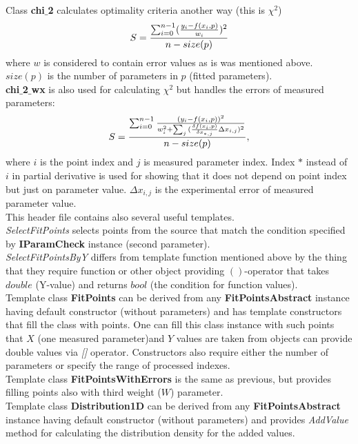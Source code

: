 \documentclass[a4paper]{article}
\begin{document}
\\
Class \textbf{chi$\_$2} calculates optimality criteria another way (this is $\chi^2$)
\begin{equation}\Large
S = \frac{\sum_{i=0}^{n-1}(\frac{y_i-f(x_i,p)}{w_i})^2}{n - size(p)}
\label{chi_2}
\end{equation}
where $w$ is considered to contain error values as is was mentioned above. $size(p)$ is the number of parameters in $p$ (fitted parameters).
\\
\textbf{chi$\_$2$\_$wx} is also used for calculating $\chi^2$ but handles the errors of measured parameters:
\begin{equation}\Large
S = \frac{\sum_{i=0}^{n-1}\frac{(y_i-f(x_i,p))^2}{w_i^2+\sum_j{(\frac{\delta f(x_i,p)}{\delta x_{*,j}}\Delta x_{i,j})^2}}}{n - size(p)},
\label{chi_2_ex}
\end{equation}
where $i$ is the point index and $j$ is measured parameter index.
Index $*$ instead of $i$ in partial derivative is used for showing that it does not depend on point index but just on parameter value.
$\Delta x_{i,j}$ is the experimental error of measured parameter value.\\
This header file contains also several useful templates.\\
\textit{SelectFitPoints} selects points from the source that match the condition specified by \textbf{IParamCheck} instance (second parameter).
\\
\textit{SelectFitPointsByY} differs from template function mentioned above by the thing that they require function or other object providing $()$-operator that takes $double$ (Y-value) and returns $bool$ (the condition for function values).
\\
Template class \textbf{FitPoints} can be derived from any \textbf{FitPointsAbstract} instance having default constructor (without parameters) and has template constructors that fill the class with points. 
One can fill this class instance with such points that $X$ (one measured parameter)and $Y$ values are taken from objects can provide double values via \textit{[]} operator.
Constructors also require either the number of parameters or specify the range of processed indexes.
\\
Template class \textbf{FitPointsWithErrors} is the same as previous, but provides filling points also with third weight ($W$) parameter.
\\
Template class \textbf{Distribution1D} can be derived from any \textbf{FitPointsAbstract} instance having default constructor (without parameters) and provides \textit{AddValue} method for calculating the distribution density for the added values.
\end{document}
